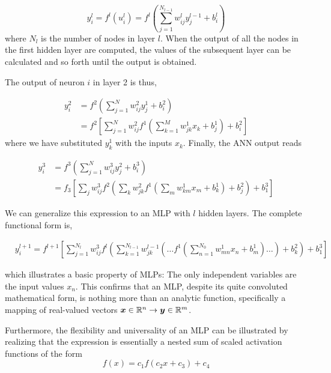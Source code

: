 \begin{equation}\label{eq:general-layer}
	y_i^l = f^l(u_i^l) = f^l\left(\sum_{j=1}^{N_{l-1}} w_{ij}^l y_j^{l-1} + b_i^l\right)
\end{equation}
where $N_l$ is the number of nodes in layer $l$. When the output of
all the nodes in the first hidden layer are computed, the values of
the subsequent layer can be calculated and so forth until the output
is obtained.

The output of neuron $i$ in layer 2 is thus,

\begin{align}\label{eq:output-layer-2}
	y_i^2 &= f^2\left(\sum_{j=1}^N w_{ij}^2 y_j^1 + b_i^2\right) \\
	&= f^2\left[\sum_{j=1}^N w_{ij}^2f^1\left(\sum_{k=1}^M w_{jk}^1 x_k + b_j^1\right) + b_i^2\right]
\end{align}
where we have substituted $y_k^1$ with the inputs $x_k$. Finally, the ANN output reads

\begin{align}
	y_i^3 &= f^3\left(\sum_{j=1}^N w_{ij}^3 y_j^2 + b_i^3\right) \\
	&= f_3\left[\sum_{j} w_{ij}^3 f^2\left(\sum_{k} w_{jk}^2 f^1\left(\sum_{m} w_{km}^1 x_m + b_k^1\right) + b_j^2\right)
	+ b_1^3\right]
\end{align}

We can generalize this expression to an MLP with $l$ hidden
layers. The complete functional form is,

\begin{align}\label{eq:complete-nn}
&y^{l+1}_i = f^{l+1}\left[\!\sum_{j=1}^{N_l} w_{ij}^3 f^l\left(\sum_{k=1}^{N_{l-1}}w_{jk}^{l-1}\left(\dots f^1\left(\sum_{n=1}^{N_0} w_{mn}^1 x_n+ b_m^1\right)\dots\right)+b_k^2\right)+b_1^3\right] &&
\end{align}

which illustrates a basic property of MLPs: The only independent
variables are the input values $x_n$.
This confirms that an MLP, despite its quite convoluted
mathematical form, is nothing more than an analytic function, specifically a
mapping of real-valued vectors ${\boldsymbol{x}} \in \mathbb{R}^n \rightarrow
{\boldsymbol{y}} \in \mathbb{R}^m$.

Furthermore, the flexibility and universality of an MLP can be
illustrated by realizing that the expression is essentially a nested
sum of scaled activation functions of the form
\begin{equation}
 f(x) = c_1 f(c_2 x + c_3) + c_4
\end{equation}

